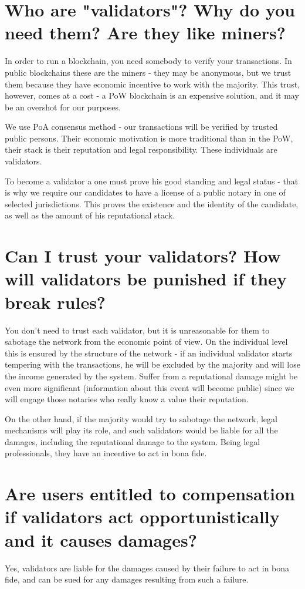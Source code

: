 \documentclass[12pt]{report}
\begin{document}
\section{Who are "validators"? Why do you need them? Are they like miners?}
\label{blockchain-validators}
In order to run a blockchain, you need somebody to verify your transactions. In public blockchains these are the miners - they may be anonymous, but we trust them because they have economic incentive to work with the majority. This trust, however, comes at a cost - a PoW blockchain is an expensive solution, and it may be an overshot for our purposes.

We use PoA consensus method - our transactions will be verified by trusted public persons. Their economic motivation is more traditional than in the PoW, their stack is their reputation and legal responsibility. These individuals are validators.

To become a validator a one must prove his good standing and legal status - that is why we require our candidates to have a license of a public notary in one of selected jurisdictions. This proves the existence and the identity of the candidate, as well as the amount of his reputational stack.

\section{Can I trust your validators? How will validators be punished if they break rules?}
\label{blockchain-trust}
You don't need to trust each validator, but it is unreasonable for them to sabotage the network from the economic point of view. On the individual level this is ensured by the structure of the network - if an individual validator starts tempering with the transactions, he will be excluded by the majority and will lose the income generated by the system. Suffer from a reputational damage might be even more significant (information about this event will become public) since we will engage those notaries who really know a value their reputation.

On the other hand, if the majority would try to sabotage the network, legal mechanisms will play its role, and such validators would be liable for all the damages, including the reputational damage to the system. Being legal professionals, they have an incentive to act in bona fide.

\section{Are users entitled to compensation if validators act opportunistically and it causes damages?}
\label{blockchain-compensation}
Yes, validators are liable for the damages caused by their failure to act in bona fide, and can be sued for any damages resulting from such a failure.
\end{document}
